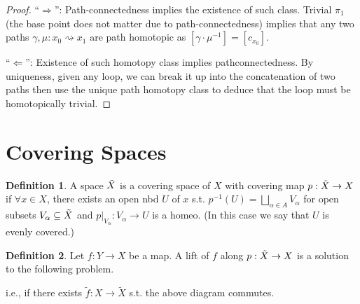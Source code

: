\documentclass{article}
\theoremstyle{definition}
\newtheorem{defn}{Definition}[section]
\theoremstyle{remark}
\theoremstyle{plain}
\begin{document}
\begin{proof}
    ``$\Rightarrow$'': Path-connectedness implies the existence of such class. Trivial $\pi_1$ (the base point does not matter due to path-connectedness) implies that any two paths $\gamma,\mu:x_0\rightsquigarrow x_1$ are path homotopic as $[\gamma\cdot\mu^{-1}]=[c_{x_0}]$.

    ``$\Leftarrow$'': Existence of such homotopy class implies pathconnectedness. By uniqueness, given any loop, we can break it up into the concatenation of two paths then use the unique path homotopy class to deduce that the loop must be homotopically trivial.
\end{proof}

\section{Covering Spaces}
\begin{defn}
    A space $\Tilde{X}$ is a covering space of $X$ with covering map $p:\Tilde{X}\to X$ if $\forall x\in X$, there exists an open nbd $U$ of $x$ s.t. $p^{-1}(U)=\bigsqcup_{\alpha\in A} V_\alpha$ for open subsets $V_\alpha\subseteq \Tilde{X}$ and $p|_{V_\alpha}:V_\alpha\to U$ is a homeo. (In this case we say that $U$ is evenly covered.)
\end{defn}
\begin{defn}
    Let $f:Y\to X$ be a map. A lift of $f$ along $p:\Tilde{X}\to X$ is a solution to the following problem.
    \begin{center}
    \end{center}
    i.e., if there exists $\tilde f:X\to \tilde X$ s.t. the above diagram commutes.
\end{defn}
\end{document}
